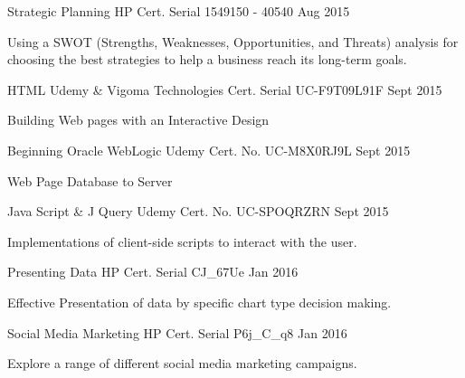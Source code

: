 \begin{cventries}
      \cventry
    {Strategic Planning}
    {HP}
    {Cert. Serial 1549150 - 40540}
    {Aug 2015 }
    {
      \begin{cvitems}
        \item {Using a SWOT (Strengths, Weaknesses, Opportunities, and Threats) analysis for choosing the best strategies to help a business reach its long-term goals.}
      \end{cvitems}
    }
    \cventry
    {HTML}
    {Udemy \& Vigoma Technologies}
    {Cert. Serial UC-F9T09L91F}
    {Sept 2015 }
    {
      \begin{cvitems}
       \item {Building  Web pages with an Interactive Design}
      \end{cvitems}
    }
    \cventry
    {Beginning Oracle WebLogic}
    {Udemy}
    {Cert. No. UC-M8X0RJ9L}
    {Sept 2015 }
    {
      \begin{cvitems}
       \item {Web Page Database to Server}
      \end{cvitems}
    }
    \cventry
    {Java Script \& J Query}
    {Udemy}
    {Cert. No. UC-SPOQRZRN}
    {Sept 2015 }
    {
      \begin{cvitems}
       \item {Implementations of client-side scripts to interact with the user.}
      \end{cvitems}
    }
    \cventry
    {Presenting Data}
    {HP}
    {Cert. Serial CJ\_67Ue}
    {Jan 2016 }
    {
      \begin{cvitems}
        \item {Effective Presentation of data by specific chart type decision making.}
      \end{cvitems}
    }
    \cventry
    {Social Media Marketing}
    {HP}
    {Cert. Serial P6j\_C\_q8}
    {Jan 2016 }
    {
      \begin{cvitems}
        \item {Explore a range of different social media marketing campaigns.}
      \end{cvitems}
    }
\end{cventries}
